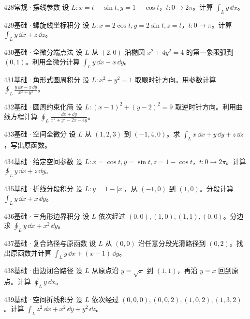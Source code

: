 \begin{exercise}{428}{常规·摆线参数}
设 $L:x=t-\sin t,y=1-\cos t$，$t:0\to2\pi$。计算 $\int_Ly\,\dd x$。
\end{exercise}
\begin{exercise}{429}{基础·螺旋线坐标积分}
设 $L:x=2\cos t,y=2\sin t,z=t$，$t:0\to\pi$。计算 $\int_Ly\,\dd x+z\,\dd z$。
\end{exercise}
\begin{exercise}{430}{基础·全微分端点法}
设 $L$ 从 $(2,0)$ 沿椭圆 $x^2+4y^2=4$ 的第一象限弧到 $(0,1)$。利用全微分计算 $\int_Ly\,\dd x+x\,\dd y$。
\end{exercise}
\begin{exercise}{431}{基础·角形式圆周积分}
设 $L:x^2+y^2=1$ 取顺时针方向。用参数计算 $\oint_L\frac{y\,\dd x-x\,\dd y}{x^2+y^2}$。
\end{exercise}
\begin{exercise}{432}{基础·圆周约束化简}
设 $L:(x-1)^2+(y-2)^2=9$ 取逆时针方向。利用曲线方程计算 $\oint_L\frac{\dd x+\dd y}{x^2+y^2-2x-4y}$。
\end{exercise}
\begin{exercise}{433}{基础·空间全微分}
设 $L$ 从 $(1,2,3)$ 到 $(-1,4,0)$。求 $\int_Lx\,\dd x+y\,\dd y+z\,\dd z$，写出原函数。
\end{exercise}
\begin{exercise}{434}{基础·给定空间参数}
设 $L:x=\cos t,y=\sin t,z=1-\cos t$，$t:0\to2\pi$。计算 $\oint_Ly\,\dd x+z\,\dd y$。
\end{exercise}
\begin{exercise}{435}{基础·折线分段积分}
设 $L:y=1-|x|$，从 $(-1,0)$ 到 $(1,0)$。分段计算 $\int_Ly\,\dd x+x\,\dd y$。
\end{exercise}
\begin{exercise}{436}{基础·三角形边界积分}
设 $L$ 依次经过 $(0,0),(1,0),(1,1),(0,0)$。分边求 $\oint_Ly\,\dd x+x^2\,\dd y$。
\end{exercise}
\begin{exercise}{437}{基础·复合路径与原函数}
设 $L$ 从 $(0,0)$ 沿任意分段光滑路径到 $(0,2)$。找出原函数并计算 $\int_Ly\,\dd x+(x-1)\,\dd y$。
\end{exercise}
\begin{exercise}{438}{基础·曲边闭合路径}
设 $L$ 从原点沿 $y=\sqrt x$ 到 $(1,1)$，再沿 $y=x$ 回到原点。计算 $\oint_Ly\,\dd x$。
\end{exercise}
\begin{exercise}{439}{基础·空间折线积分}
设 $L$ 依次经过 $(0,0,0),(0,0,2),(1,0,2),(1,3,2)$。计算 $\int_Lz^2\,\dd x+x^2\,\dd y+y^2\,\dd z$。
\end{exercise}
